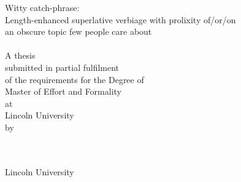 
\hypertarget{TitlePage}{}


\begin{spacing}{1}
\begin{titlepage}
\begin{center}
\vspace*{9pt}
{\Medium\huge Witty catch-phrase:\\\smallskip Length-enhanced superlative verbiage with prolixity of/or/on\\\bigskip an obscure topic few people care about\\[1.7cm]}
 \\[1.1cm]
{\LARGE A thesis \\\smallskip submitted in partial fulfilment\\\smallskip of the requirements for the Degree of\\}
\medskip
{\LARGE Master of Effort and Formality\\
\vspace{37pt}
at\\
\vspace{17pt}
Lincoln University\\
\vspace{17pt}
by\\
\vspace{37pt}
\LARGE\namen\\[1.1cm]}

 \\[1.7cm]

{\Medium\LARGE Lincoln University\\\bigskip {}}
\vfill

\end{center}
\end{titlepage}
\end{spacing}



\begin{spacing}{1}
\section*{\vspace{-33pt}\normalfont\Large{}}
\end{spacing}
{}

